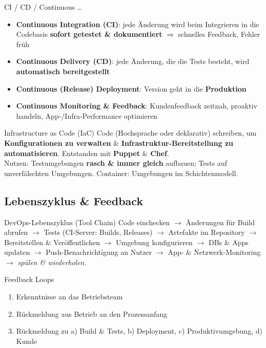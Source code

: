 \documentclass[a4paper, fontsize=7pt]{scrartcl}
\begin{document}
\begin{mainbox}{CI / CD / Continuous \ldots}
\begin{itemize}
    \item \textbf{Continuous Integration (CI)}: jede Änderung wird beim
          Integrieren in die Codebasis \textbf{sofort getestet \&
          dokumentiert} $\Rightarrow$ schnelles Feedback, Fehler früh
    \item \textbf{Continuous Delivery (CD)}: jede Änderung, die die Tests
          besteht, wird \textbf{automatisch bereitgestellt}
    \item \textbf{Continuous (Release) Deployment}: Version geht in die
          \textbf{Produktion}
    \item \textbf{Continuous Monitoring \& Feedback}: Kundenfeedback
          zeitnah, proaktiv handeln, App-/Infra-Performance optimieren
\end{itemize}
\end{mainbox}

\begin{mainbox}{Infrastructure as Code (IaC)}
Code (Hochsprache oder deklarativ) schreiben, um \textbf{Konfigurationen
zu verwalten} \& \textbf{Infrastruktur-Bereitstellung zu automatisieren}.
Entstanden mit \textbf{Puppet} \& \textbf{Chef}.\\
Nutzen: Testumgebungen \textbf{rasch \& immer gleich} aufbauen; Tests auf
unverfälschten Umgebungen. Container: Umgebungen im Schichtenmodell.
\end{mainbox}

\subsection{Lebenszyklus \& Feedback}

\begin{mainbox}{DevOps-Lebenszyklus (Tool Chain)}
Code einchecken $\to$ Änderungen für Build abrufen $\to$ Tests (CI-Server:
Builds, Releases) $\to$ Artefakte im Repository $\to$ Bereitstellen \&
Veröffentlichen $\to$ Umgebung konfigurieren $\to$ DBs \& Apps updaten
$\to$ Push-Benachrichtigung an Nutzer $\to$ App- \& Netzwerk-Monitoring
$\to$ \emph{spülen \& wiederholen}.
\end{mainbox}

\begin{subbox}{Feedback Loops}
\begin{enumerate}
    \item Erkenntnisse an das Betriebsteam
    \item Rückmeldung aus Betrieb an den Prozessanfang
    \item[3.] Rückmeldung zu a) Build \& Tests, b) Deployment,
          c) Produktivumgebung, d) Kunde
\end{enumerate}
\end{subbox}
\end{document}
